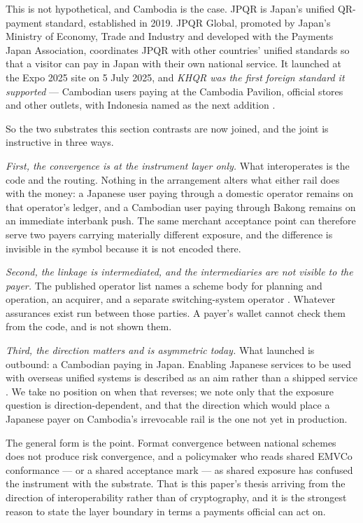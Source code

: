 \documentclass[10pt,a4paper,twocolumn]{article}
\begin{document}
This is not hypothetical, and Cambodia is the case. JPQR is Japan's unified
QR-payment standard, established in 2019. JPQR Global, promoted by Japan's
Ministry of Economy, Trade and Industry and developed with the Payments Japan
Association, coordinates JPQR with other countries' unified standards so that a
visitor can pay in Japan with their own national service. It launched at the
Expo 2025 site on 5 July 2025, and \emph{KHQR was the first foreign standard it
supported} --- Cambodian users paying at the Cambodia Pavilion, official stores
and other outlets, with Indonesia named as the next addition
\citep{expo2025jpqr}.

So the two substrates this section contrasts are now joined, and the joint is
instructive in three ways.

\emph{First, the convergence is at the instrument layer only.} What
interoperates is the code and the routing. Nothing in the arrangement alters
what either rail does with the money: a Japanese user paying through a domestic
operator remains on that operator's ledger, and a Cambodian user paying through
Bakong remains on an immediate interbank push. The same merchant acceptance
point can therefore serve two payers carrying materially different exposure, and
the difference is invisible in the symbol because it is not encoded there.

\emph{Second, the linkage is intermediated, and the intermediaries are not
visible to the payer.} The published operator list names a scheme body for
planning and operation, an acquirer, and a separate switching-system operator
\citep{expo2025jpqr}. Whatever assurances exist run between those parties. A
payer's wallet cannot check them from the code, and is not shown them.

\emph{Third, the direction matters and is asymmetric today.} What launched is
outbound: a Cambodian paying in Japan. Enabling Japanese services to be used
with overseas unified systems is described as an aim rather than a shipped
service \citep{expo2025jpqr}. We take no position on when that reverses; we note
only that the exposure question is direction-dependent, and that the direction
which would place a Japanese payer on Cambodia's irrevocable rail is the one not
yet in production.

The general form is the point. Format convergence between national schemes does
not produce risk convergence, and a policymaker who reads shared EMVCo
conformance --- or a shared acceptance mark --- as shared exposure has confused
the instrument with the substrate. That is this paper's thesis arriving from the
direction of interoperability rather than of cryptography, and it is the
strongest reason to state the layer boundary in terms a payments official can
act on.
\end{document}
